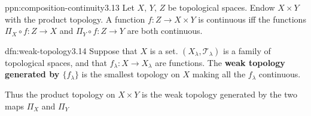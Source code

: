 \documentclass[landscape, 8pt]{extarticle}
\begin{document}
\begin{multicols}{3}
\begin{ppn}{ppn:composition-continuity}{3.13}
    Let $X,\,Y,\,Z$ be topological spaces. Endow $X \times Y$ with the product topology. A function $f : Z \to X \times Y$ is continuous iff the functions $\Pi_{X} \circ f : Z \to X$ and $\Pi_{Y} \circ f : Z \to Y$ are both continuous.
\end{ppn}

\begin{dfn}{dfn:weak-topology}{3.14}
    Suppose that $X$ is a set. $(X_{\lambda}, \mathcal{T}_{\lambda})$ is a family of topological spaces, and that $f_{\lambda} : X \to X_{\lambda}$ are functions. The \textbf{weak topology generated by $\{f_{\lambda}\}$} is the smallest topology on $X$ making all the $f_{\lambda}$ continuous.

    Thus the product topology on $X \times Y$ is the weak topology generated by the two maps $\Pi_{X}$ and $\Pi_{Y}$
\end{dfn}

\lipsum[1-12]
\end{multicols}
\end{document}
